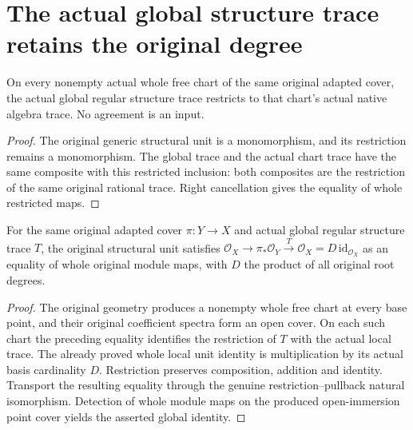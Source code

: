 \section{The actual global structure trace retains the original degree}

\begin{lemma}
\label{lem:kn-structure-trace-global-original-chart}
\leanok
On every nonempty actual whole free chart of the same original adapted
cover, the actual global regular structure trace restricts to that
chart's actual native algebra trace. No agreement is an input.
\end{lemma}
\begin{proof}
The original generic structural unit is a monomorphism, and its
restriction remains a monomorphism. The global trace and the actual
chart trace have the same composite with this restricted inclusion:
both composites are the restriction of the same original rational
trace. Right cancellation gives the equality of whole restricted maps.
\end{proof}

\begin{theorem}
\label{thm:kn-structure-trace-global-unit-degree}
\leanok
For the same original adapted cover $\pi:Y\to X$ and actual global
regular structure trace $T$, the original structural unit satisfies
$\mathcal O_X\to\pi_*\mathcal O_Y\xrightarrow{T}\mathcal O_X
=D\,\mathrm{id}_{\mathcal O_X}$ as an equality of whole original
module maps, with $D$ the product of all original root degrees.
\end{theorem}
\begin{proof}
The original geometry produces a nonempty whole free chart at every
base point, and their original coefficient spectra form an open cover.
On each such chart the preceding equality identifies the restriction
of $T$ with the actual local trace. The already proved whole local
unit identity is multiplication by its actual basis cardinality $D$.
Restriction preserves composition, addition and identity. Transport
the resulting equality through the genuine restriction--pullback
natural isomorphism. Detection of whole module maps on the produced
open-immersion point cover yields the asserted global identity.
\end{proof}
